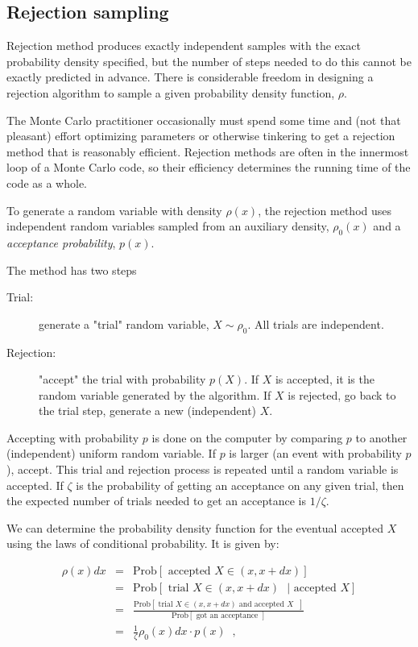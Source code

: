 \subsection{Rejection sampling}
Rejection method produces exactly independent samples with the exact probability density specified, but the number of steps needed to do this cannot be exactly predicted in advance. There is considerable freedom in designing a rejection algorithm to sample a given probability density function, $\rho$.  

The Monte Carlo practitioner occasionally must spend some time and (not that pleasant) effort optimizing parameters or otherwise tinkering to get a rejection  method that is reasonably efficient. Rejection methods are often in the innermost loop of a Monte Carlo code, so their efficiency determines the running time of the code as a whole.  

To generate a random variable with density $\rho(x)$, the rejection method uses independent random variables sampled from an auxiliary density, $\rho_0(x)$ and a \textit{acceptance probability}, $p(x)$.

The method has two steps
\begin{description}
    \item[Trial:] generate a "trial" random variable, $X \sim \rho_0$. All trials are independent.
    \item[Rejection:] "accept" the trial with probability $p(X)$. If $X$ is accepted, it is the random variable generated by the algorithm. If $X$ is rejected, go back to the trial step, generate a new (independent) $X$.
\end{description}

Accepting with probability $p$ is done on the computer by comparing $p$ to another (independent) uniform random variable.  If $p$ is larger (an event with probability $p$), accept. This trial and rejection process is repeated until a random variable is accepted. If $\zeta$ is the probability of getting an acceptance on any given trial, then the expected number of trials needed to get an acceptance
is $1/\zeta$. 

We can determine the probability density function for the eventual accepted $X$ using the laws of conditional probability.  It is given by:

\begin{eqnarray*}
\rho(x)dx & = & \mbox{Prob}\left[ \mbox{ accepted $X \in (x,x+dx)$} \right] \\
          & = & \mbox{Prob}\left[ \mbox{ trial $X \in (x,x+dx)$ } 
              | \mbox{ accepted $X$} \right]                          \\
          & = & \frac{ \mbox{Prob}\left[ \mbox{ trial $X \in (x,x+dx)$ 
                                and accepted $X$ } \right] }
                     { \mbox{Prob}\left[ \mbox{ got an acceptance }\right] } \\
         & = & \frac{1}{\zeta}\rho_0(x)dx\cdot p(x) \;\; ,
\end{eqnarray*}

